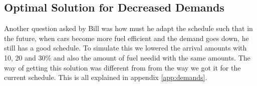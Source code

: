 \subsection{Optimal Solution for Decreased Demands}
Another question asked by Bill was how must he adapt the schedule such that in the future, when cars become more fuel efficient and the demand goes down, he still has a good schedule. 
To simulate this we lowered the arrival amounts with 10, 20 and 30\% and  also the amount of fuel needid with the same amounts. 
The way of getting this solution was different from from the way we got it for the current schedule.
This is all explained in appendix \autoref{app:demands}.